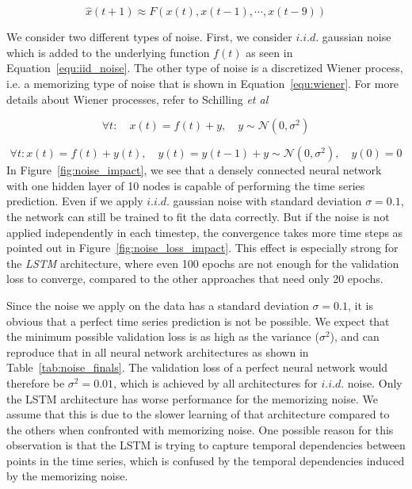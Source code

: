 \documentclass{article}
\begin{document}
\begin{equation}
  \hat{x} (t + 1) \approx F(x(t), x(t-1), \cdots, x(t-9))
  \label{equ:sine}
\end{equation}

We consider two different types of noise. First, we consider $i.i.d.$ gaussian
noise which is added to the underlying function $f(t)$
as seen in Equation~\ref{equ:iid_noise}. The other type of noise is a
discretized Wiener process, i.e. a memorizing type of noise that is shown in
Equation~\ref{equ:wiener}.
For more details about Wiener processes, refer to Schilling
\textit{et al} \cite{schilling2014}

\begin{equation}
  \forall t: \quad x(t) = f(t) + y, \quad y \sim \mathcal{N}(0, \sigma^2)
  \label{equ:iid_noise}
\end{equation}

\begin{equation}
  \forall t: x(t) = f(t) + y(t), \quad y(t) = y(t-1) + y \sim \mathcal{N}(0, \sigma^2), \quad y(0) = 0
  \label{equ:wiener}
\end{equation}
In Figure~\ref{fig:noise_impact}, we see that a densely connected neural network
with one hidden layer of 10 nodes is capable of performing the time series
prediction. Even if we apply $i.i.d.$ gaussian noise with standard
deviation $\sigma = 0.1$, the
network can still be trained to fit the data correctly. But if the noise is not
applied independently in each timestep, the convergence takes more time steps as
pointed out in Figure~\ref{fig:noise_loss_impact}. This effect is especially
strong for the \emph{LSTM} architecture, where even 100 epochs are not enough
for the validation loss to converge, compared to the other approaches that need
only 20 epochs.

Since the noise we apply on the data has a standard deviation $\sigma = 0.1$,
it is obvious that a perfect time series prediction is not be possible. We
expect that the minimum possible validation loss is as high as the variance
($\sigma^2$), and can reproduce that in all neural network architectures as
shown in Table~\ref{tab:noise_finals}. The validation loss of a perfect
neural network would therefore be $\sigma^2 = 0.01$, which is achieved by all
architectures for $i.i.d.$ noise. Only the LSTM architecture has worse
performance for the memorizing noise. We assume that this is due to the slower
learning of that architecture compared to the others when confronted with
memorizing noise. One possible reason for this observation is that the LSTM is
trying to capture temporal dependencies between points in the time series, which
is confused by the temporal dependencies induced by the memorizing noise.
\end{document}
